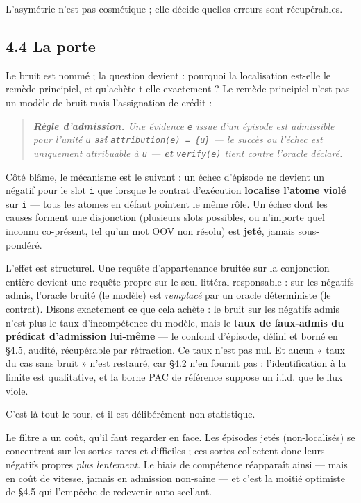\documentclass[11pt]{article}
\begin{document}
L'asymétrie n'est pas cosmétique ; elle décide quelles erreurs sont récupérables.

\subsection*{4.4 La porte}

Le bruit est nommé ; la question devient : pourquoi la localisation est-elle le remède principiel, et qu'achète-t-elle exactement ? Le remède principiel n'est pas un modèle de bruit mais l'assignation de crédit :

\begin{quote}\itshape \textbf{Règle d'admission.} Une évidence \texttt{e} issue d'un épisode est admissible pour l'unité \texttt{u} \textbf{ssi} \texttt{attribution(e) = \{u\}} — le succès ou l'échec est uniquement attribuable à \texttt{u} — \textbf{et} \texttt{verify(e)} tient contre l'oracle déclaré.\end{quote}

Côté blâme, le mécanisme est le suivant : un échec d'épisode ne devient un négatif pour le slot \texttt{i} que lorsque le contrat d'exécution \textbf{localise l'atome violé} sur \texttt{i} — tous les atomes en défaut pointent le même rôle. Un échec dont les causes forment une disjonction (plusieurs slots possibles, ou n'importe quel inconnu co-présent, tel qu'un mot OOV non résolu) est \textbf{jeté}, jamais sous-pondéré.

L'effet est structurel. Une requête d'appartenance bruitée sur la conjonction entière devient une requête propre sur le seul littéral responsable : sur les négatifs admis, l'oracle bruité (le modèle) est \emph{remplacé} par un oracle déterministe (le contrat). Disons exactement ce que cela achète : le bruit sur les négatifs admis n'est plus le taux d'incompétence du modèle, mais le \textbf{taux de faux-admis du prédicat d'admission lui-même} — le confond d'épisode, défini et borné en §4.5, audité, récupérable par rétraction. Ce taux n'est pas nul. Et aucun « taux du cas sans bruit » n'est restauré, car §4.2 n'en fournit pas : l'identification à la limite est qualitative, et la borne PAC de référence suppose un i.i.d. que le flux viole.

C'est là tout le tour, et il est délibérément non-statistique.

Le filtre a un coût, qu'il faut regarder en face. Les épisodes jetés (non-localisés) se concentrent sur les sortes rares et difficiles ; ces sortes collectent donc leurs négatifs propres \emph{plus lentement}. Le biais de compétence réapparaît ainsi — mais en coût de vitesse, jamais en admission non-saine — et c'est la moitié optimiste de §4.5 qui l'empêche de redevenir auto-scellant.
\end{document}
